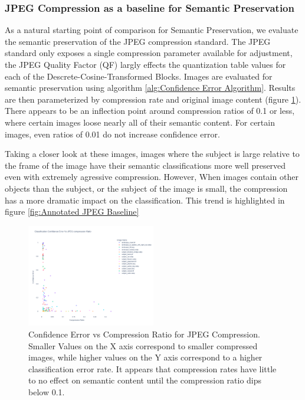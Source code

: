 
\subsubsection{JPEG Compression as a baseline for Semantic Preservation}

As a natural starting point of comparison for Semantic Preservation, we evaluate the semantic preservation of the JPEG compression standard.
The JPEG standard only exposes a single compression parameter available for adjustment, the JPEG Quality Factor (QF) largly effects the quantization table values for each of the Descrete-Cosine-Transformed Blocks.
Images are evaluated for semantic preservation using algorithm \ref{alg:Confidence Error Algorithm}.
Results are then parameterized by compression rate and original image content (figure \ref{fig:Comp vs Ratio JPEG Baseline}). There appears to be an inflection point around compression ratios of 0.1 or less, where certain images loose nearly all of their semantic content. For certain images, even ratios of 0.01 do not increase confidence error.

Taking a closer look at these images, images where the subject is large relative to the frame of the image have their semantic classifications more well preserved even with extremely agressive compression. However, When images contain other objects than the subject, or the subject of the image is small, the compression has a more dramatic impact on the classification. This trend is highlighted in figure \ref{fig:Annotated JPEG Baseline}

\begin{figure}
    \label{fig:Comp vs Ratio JPEG Baseline}
    \includegraphics[width=0.5\textwidth]{assets/Baseline JPEG Confidence vs Comp Ratio.png}
    \caption{Confidence Error vs Compression Ratio for JPEG Compression. Smaller Values on the X axis correspond to smaller compressed images, while higher values on the Y axis correspond to a higher classification error rate. It appears that compression rates have little to no effect on semantic content until the compression ratio dips below 0.1.}
\end{figure}

